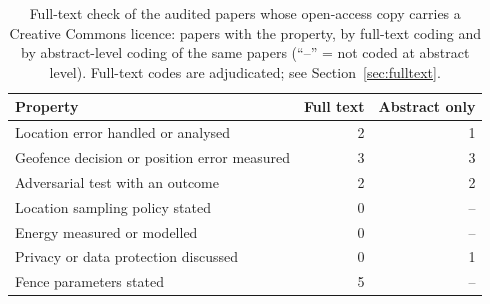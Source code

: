\begin{table}[tbp]\centering\small
\caption{Full-text check of the \ftN{} audited papers whose open-access copy carries a Creative Commons licence: papers with the property, by full-text coding and by abstract-level coding of the same papers (``--'' = not coded at abstract level). Full-text codes are adjudicated; see Section~\ref{sec:fulltext}.}\label{tab:fulltext}
\begin{tabular}{@{}lrr@{}}\toprule Property & Full text & Abstract only \\ \midrule
Location error handled or analysed & 2 & 1 \\
Geofence decision or position error measured & 3 & 3 \\
Adversarial test with an outcome & 2 & 2 \\
Location sampling policy stated & 0 & -- \\
Energy measured or modelled & 0 & -- \\
Privacy or data protection discussed & 0 & 1 \\
Fence parameters stated & 5 & -- \\
\bottomrule\end{tabular}\end{table}
